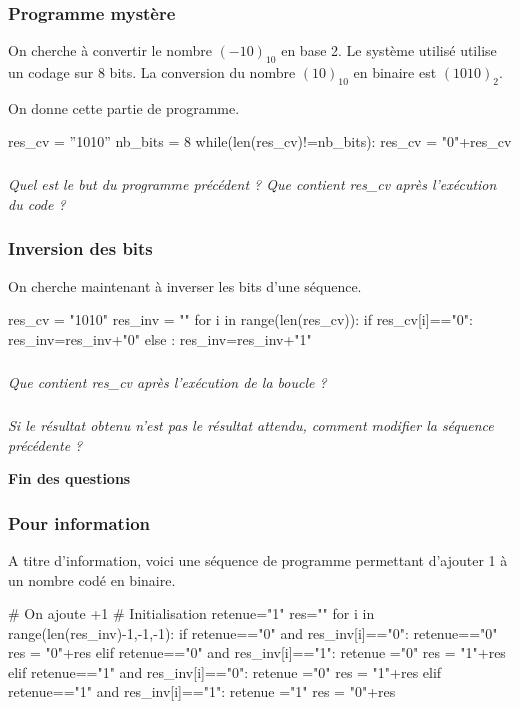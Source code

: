 \documentclass[10pt]{article}
\begin{document}
\subsubsection{Programme mystère}
On cherche à convertir le nombre $(-10)_{10}$ en base 2. Le système utilisé utilise un codage sur 8 bits. La conversion du nombre $(10)_{10}$ en binaire est $(1010)_{2}$.

On donne cette partie de programme. 
\begin{py}
\begin{python}
res_cv = ''1010''
nb_bits = 8
while(len(res_cv)!=nb_bits):
    res_cv = "0"+res_cv
\end{python}
\end{py}

\subparagraph{}
\textit{Quel est le but du programme précédent ? Que contient \textsf{res\_cv} après l'exécution du code ?}

\subsubsection{Inversion des bits}
On cherche maintenant à inverser les bits d'une séquence.

\begin{py}
\begin{python}
res_cv = "1010"
res_inv = ""
for i in range(len(res_cv)):
    if res_cv[i]=="0":
        res_inv=res_inv+"0"
    else :
        res_inv=res_inv+"1"
\end{python}
\end{py}

\subparagraph{}
\textit{Que contient \textsf{res\_cv} après l'exécution de la boucle ?}

\subparagraph{}
\textit{Si le résultat obtenu n'est pas le résultat attendu, comment modifier la séquence précédente ?}

\begin{center}
\textbf{Fin des questions}
\end{center}
\subsubsection{Pour information}
A titre d'information, voici une séquence de programme permettant d'ajouter 1 à un nombre codé en binaire.


\begin{py}
\begin{python}
# On ajoute +1
# Initialisation
retenue="1"
res=""
for i in range(len(res_inv)-1,-1,-1):
    if retenue=="0" and res_inv[i]=="0":
        retenue=="0"
        res = "0"+res
    elif retenue=="0" and res_inv[i]=="1":
        retenue ="0"
        res = "1"+res
    elif retenue=="1" and res_inv[i]=="0":
        retenue ="0"
        res = "1"+res
    elif retenue=="1" and res_inv[i]=="1":
        retenue ="1"
        res = "0"+res
\end{python}
\end{py}
  
\end{document}
